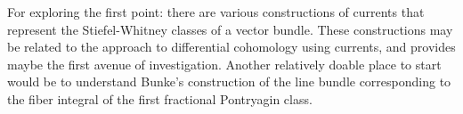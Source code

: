 \documentclass{amsart}
\begin{document}
For exploring the first point: there are various constructions of currents
that represent the Stiefel-Whitney classes of a vector bundle. These constructions
may be related to the approach to differential cohomology using currents, and
provides maybe the first avenue of investigation. Another relatively doable place
to start would be to understand Bunke's construction of the line bundle corresponding
to the fiber integral of the first fractional Pontryagin class.


%
%
\end{document}
